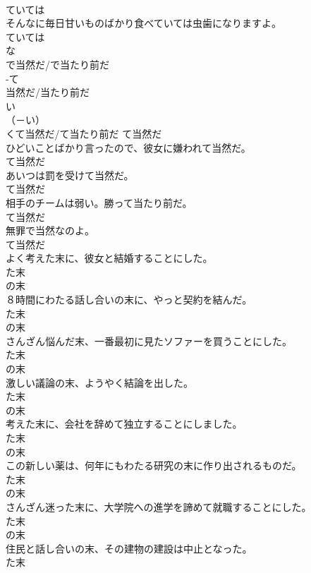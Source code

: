 \documentclass[8pt]{extreport}
\begin{document}
\begin{CJK}{UTF8}{min}
\\	ていては	
\\	そんなに毎日甘いものばかり食べていては虫歯になりますよ。	
\\	ていては	
\\	な
\\	で当然だ/で当たり前だ	
\\	-て
\\	当然だ/当たり前だ	
\\	い
\\	（－い） 
\\	くて当然だ/て当たり前だ	て当然だ	
\\	ひどいことばかり言ったので、彼女に嫌われて当然だ。	
\\	て当然だ	
\\	あいつは罰を受けて当然だ。	
\\	て当然だ	
\\	相手のチームは弱い。勝って当たり前だ。	
\\	て当然だ	
\\	無罪で当然なのよ。	
\\	て当然だ	
\\	よく考えた末に、彼女と結婚することにした。	
\\	た末 
\\	の末	
\\	８時間にわたる話し合いの末に、やっと契約を結んだ。	
\\	た末 
\\	の末	
\\	さんざん悩んだ末、一番最初に見たソファーを買うことにした。	
\\	た末 
\\	の末	
\\	激しい議論の末、ようやく結論を出した。	
\\	た末 
\\	の末	
\\	考えた末に、会社を辞めて独立することにしました。	
\\	た末 
\\	の末	
\\	この新しい薬は、何年にもわたる研究の末に作り出されるものだ。	
\\	た末 
\\	の末	
\\	さんざん迷った末に、大学院への進学を諦めて就職することにした。	
\\	た末 
\\	の末	
\\	住民と話し合いの末、その建物の建設は中止となった。	
\\	た末 

\end{CJK}
\end{document}
